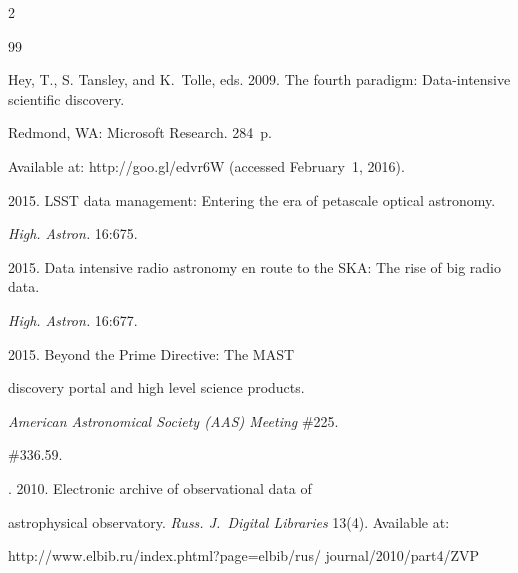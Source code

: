  \begin{multicols}{2}





\renewcommand{\bibname}{\protect\rmfamily References}







{\small\frenchspacing


 {%




 \begin{thebibliography}{99}




{Hey, T., S. Tansley, and K.~Tolle}, eds. 2009. The fourth paradigm: Data-intensive scientific discovery. 


Redmond, WA: Microsoft Research. 284~p.


Available at: {\sf http://goo.gl/edvr6W} (accessed February~1, 2016).




 2015. LSST data management: Entering the era of petascale optical astronomy. 


\textit{High. Astron.} 16:675.




 2015. Data intensive radio astronomy en route to the SKA: The rise of big radio data. 


\textit{High. Astron.} 16:677.




 2015. Beyond the Prime Directive: The MAST 


discovery portal and high level science products.


\textit{American Astronomical Society (AAS) Meeting} \#225. 


\#336.59.




. 2010. Electronic archive of observational data of 


astrophysical observatory. \textit{Russ. J.~Digital Libraries} 13(4). Available at: {\sf 


http://www.elbib.ru/index.phtml?page=elbib/rus/ journal/2010/part4/ZVP} 



\end{thebibliography}}}
\end{multicols}
